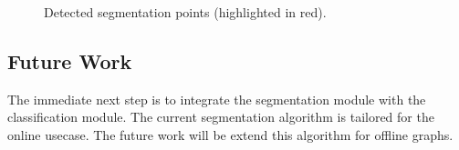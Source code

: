 \begin{figure}
\begin{subfigure}{0.8\textwidth}
	\end{subfigure}
	\caption{Detected segmentation points (highlighted in red).}
	\label{fig:seg_results}
\end{figure}

\subsection{Future Work}
The immediate next step is to integrate the segmentation module with the classification module. The current segmentation algorithm is tailored for the online usecase. The future work will be extend this algorithm for offline graphs.
